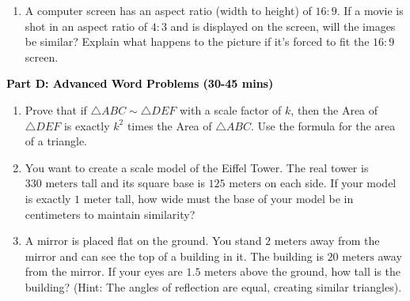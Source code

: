 \documentclass[12pt, letterpaper, fleqn]{article}
\begin{document}
\begin{enumerate}[itemsep=5.5cm, leftmargin=0.6cm, resume]
\item A computer screen has an aspect ratio (width to height) of $16:9$. If a movie is shot in an aspect ratio of $4:3$ and is displayed on the screen, will the images be similar? Explain what happens to the picture if it's forced to fit the $16:9$ screen.
\end{enumerate}

\newpage

\begin{tcolorbox}[colback=customteal!20]
\large\textcolor{black}{\textbf{Part D: Advanced Word Problems (30-45 mins)}}
\end{tcolorbox}

\vspace{3mm}

\begin{enumerate}[itemsep=5.5cm, leftmargin=0.6cm, resume]
\item Prove that if $\triangle ABC \sim \triangle DEF$ with a scale factor of $k$, then the Area of $\triangle DEF$ is exactly $k^2$ times the Area of $\triangle ABC$. Use the formula for the area of a triangle.
\item You want to create a scale model of the Eiffel Tower. The real tower is $330\text{ meters}$ tall and its square base is $125\text{ meters}$ on each side. If your model is exactly $1\text{ meter}$ tall, how wide must the base of your model be in centimeters to maintain similarity?
\item A mirror is placed flat on the ground. You stand $2\text{ meters}$ away from the mirror and can see the top of a building in it. The building is $20\text{ meters}$ away from the mirror. If your eyes are $1.5\text{ meters}$ above the ground, how tall is the building? (Hint: The angles of reflection are equal, creating similar triangles).
\end{enumerate}
\end{document}
